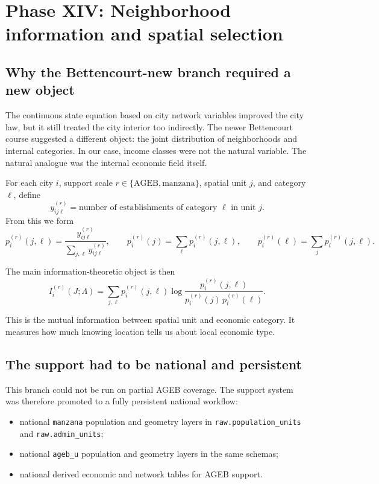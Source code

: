 \documentclass[11pt]{article}
\begin{document}
\section{Phase XIV: Neighborhood information and spatial selection}

\subsection{Why the Bettencourt-new branch required a new object}

The continuous state equation based on city network variables improved the city law, but it still treated the city interior too indirectly. The newer Bettencourt course suggested a different object: the joint distribution of neighborhoods and internal categories. In our case, income classes were not the natural variable. The natural analogue was the internal economic field itself.

For each city \(i\), support scale \(r\in\{\text{AGEB},\text{manzana}\}\), spatial unit \(j\), and category \(\ell\), define
\begin{equation}
y_{ij\ell}^{(r)}

=
\text{number of establishments of category } \ell \text{ in unit } j.
\end{equation}
From this we form
\begin{equation}
p_i^{(r)}(j,\ell)
=
\frac{y_{ij\ell}^{(r)}}{\sum_{j,\ell} y_{ij\ell}^{(r)}},
\qquad
p_i^{(r)}(j)=\sum_\ell p_i^{(r)}(j,\ell),
\qquad
p_i^{(r)}(\ell)=\sum_j p_i^{(r)}(j,\ell).
\end{equation}

The main information-theoretic object is then
\begin{equation}
I_i^{(r)}(J;\Lambda)
=
\sum_{j,\ell}
p_i^{(r)}(j,\ell)
\log\frac{p_i^{(r)}(j,\ell)}{p_i^{(r)}(j)\,p_i^{(r)}(\ell)}.
\label{eq:mi-main}
\end{equation}

This is the mutual information between spatial unit and economic category. It measures how much knowing location tells us about local economic type.

\subsection{The support had to be national and persistent}

This branch could not be run on partial AGEB coverage. The support system was therefore promoted to a fully persistent national workflow:
\begin{itemize}
\item national \texttt{manzana} population and geometry layers in \texttt{raw.population\_units} and \texttt{raw.admin\_units};
\item national \texttt{ageb\_u} population and geometry layers in the same schemas;
\item national derived economic and network tables for AGEB support.
\end{itemize}
\end{document}
